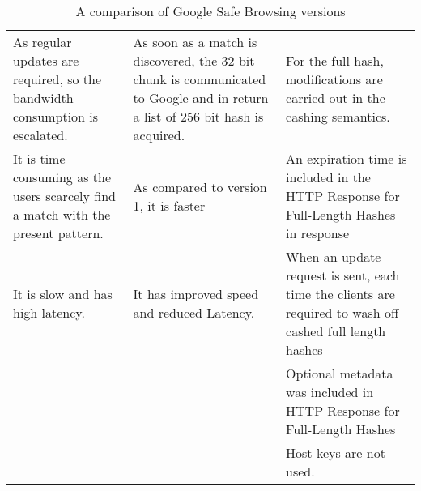\begin{singlespace}
\begin{table}[!b]
\begin{center}
\begin{tabular}{  m{11.9em}  m{11.9em}  m{11.9em}  }
				As regular updates are required, so the
				bandwidth consumption is escalated.     & As soon as a match is discovered,
				the 32 bit chunk is
				communicated to Google and in
				return a list of 256 bit hash is
				acquired.                               & For the full hash, modifications are carried out
				in the cashing semantics.                                                                                                           \\

				It is time consuming as the users scarcely
				find a match with the present pattern.  & As compared to version 1, it is
				faster                                  & An expiration time is included in the HTTP
				Response for Full-Length Hashes in
				response \newline                                                                                                                   \\

				It is slow and has high latency.        & It has improved speed and reduced
				Latency.                                & When an update request is sent, each time the
				clients are required to wash off cashed full
				length hashes \newline                                                                                                              \\

				                                        &                                                  & Optional metadata was included in HTTP
				Response for Full-Length Hashes  \newline                                                                                           \\

				                                        &                                                  & Host keys are not used.                \\\bottomrule
			\end{tabular}
			\caption{A comparison of Google Safe Browsing versions \citep{Priyam_Sandhu}}
			\label{tab:GSB_VERSIONS}
		\end{center}
	\end{table}
\end{singlespace}


